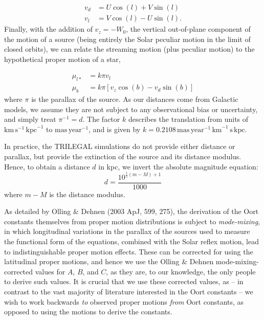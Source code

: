 \documentclass[fleqn,usenatbib]{mnras}
\begin{document}
\begin{align}
    v_d &= U\cos(l) + V\sin(l) \\
    v_l &= V\cos(l) - U\sin(l).
\end{align}
Finally, with the addition of $v_z = -W_0$, the vertical out-of-plane component of the motion of a source (being entirely the Solar peculiar motion in the limit of closed orbits), we can relate the streaming motion (plus peculiar motion) to the hypothetical proper motion of a star,

\begin{align}
    \mu_{l*} &= k \pi v_l \\
    \mu_b &= k \pi\left[v_z \cos(b) - v_d \sin(b)\right]
\end{align}
where $\pi$ is the parallax of the source.
As our distances come from Galactic models, we assume they are not subject to any observational bias or uncertainty, and simply treat $\pi^{-1} = d$.
The factor $k$ describes the translation from units of $\mathrm{km}\,\mathrm{s}^{-1}\,\mathrm{kpc}^{-1}$ to $\mathrm{mas}\,\mathrm{year}^{-1}$, and is given by $k = 0.2108\,\mathrm{mas}\,\mathrm{year}^{-1}\,\mathrm{km}^{-1}\,\mathrm{s}\,\mathrm{kpc}$.

In practice, the TRILEGAL simulations do not provide either distance or parallax, but provide the extinction of the source and its distance modulus.
Hence, to obtain a distance $d$ in kpc, we invert the absolute magnitude equation:
\begin{equation}
    d = \frac{10^{\frac{1}{5}(m - M) + 1}}{1000}
\end{equation}
where $m - M$ is the distance modulus.

As detailed by Olling \& Dehnen (2003 ApJ, 599, 275), the derivation of the Oort constants themselves from proper motion distributions is subject to \textit{mode-mixing}, in which longitudinal variations in the parallax of the sources used to measure the functional form of the equations, combined with the Solar reflex motion, lead to indistinguishable proper motion effects.
These can be corrected for using the latitudinal proper motions, and hence we use the Olling \& Dehnen mode-mixing-corrected values for $A$, $B$, and $C$, as they are, to our knowledge, the only people to derive such values.
It is crucial that we use these corrected values, as -- in contrast to the vast majority of literature interested in the Oort constants -- we wish to work backwards \textit{to} observed proper motions \textit{from} Oort constants, as opposed to using the motions to derive the constants.
\end{document}
